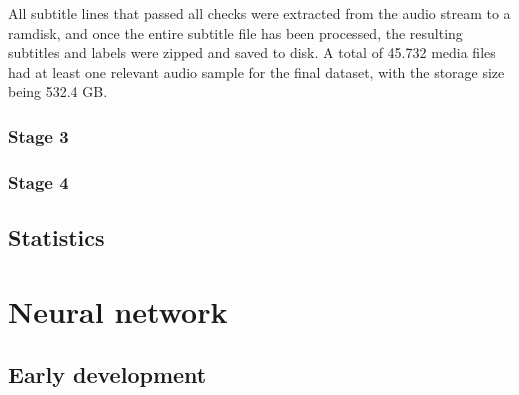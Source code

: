 All subtitle lines that passed all checks were extracted from the audio stream to a ramdisk, and once the entire subtitle file has been processed, the resulting subtitles and labels were zipped and saved to disk.
A total of 45.732 media files had at least one relevant audio sample for the final dataset, with the storage size being 532.4 GB.


\subsubsection{Stage 3}


\subsubsection{Stage 4}



\subsection{Statistics}


\section{Neural network}


\subsection{Early development}


